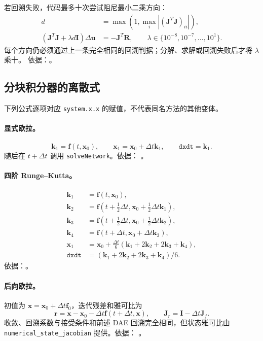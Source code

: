 若回溯失败，代码最多十次尝试阻尼最小二乘方向：
\begin{align}
 d&=\max\left(1,\max_i |(\mathbf J^T\mathbf J)_{ii}|\right),\\
 (\mathbf J^T\mathbf J+\lambda d\mathbf I)\Delta\mathbf u&=-\mathbf J^T\mathbf R,
 \qquad \lambda\in\{10^{-8},10^{-7},\ldots,10^1\}.
\end{align}
每个方向仍必须通过上一条完全相同的回溯判据；分解、求解或回溯失败后才将 $\lambda$ 乘十。
依据：。

\subsection{分块积分器的离散式}
下列公式逐项对应 \texttt{system.x.x} 的赋值，不代表同名方法的其他变体。

\paragraph{显式欧拉。}
\begin{equation}
 \mathbf k_1=\mathbf f(t,\mathbf x_0),\qquad
 \mathbf x_1=\mathbf x_0+\Delta t\mathbf k_1,
 \qquad \texttt{dxdt}=\mathbf k_1.
\end{equation}
随后在 $t+\Delta t$ 调用 \texttt{solveNetwork}。依据：
。

\paragraph{四阶 Runge--Kutta。}
\begin{align}
 \mathbf k_1&=\mathbf f(t,\mathbf x_0),\\
 \mathbf k_2&=\mathbf f(t+\tfrac12\Delta t,\mathbf x_0+\tfrac12\Delta t\mathbf k_1),\\
 \mathbf k_3&=\mathbf f(t+\tfrac12\Delta t,\mathbf x_0+\tfrac12\Delta t\mathbf k_2),\\
 \mathbf k_4&=\mathbf f(t+\Delta t,\mathbf x_0+\Delta t\mathbf k_3),\\
 \mathbf x_1&=\mathbf x_0+\frac{\Delta t}{6}
 (\mathbf k_1+2\mathbf k_2+2\mathbf k_3+\mathbf k_4),\\
 \texttt{dxdt}&=(\mathbf k_1+2\mathbf k_2+2\mathbf k_3+\mathbf k_4)/6.
\end{align}
依据：。

\paragraph{后向欧拉。}
初值为 $\mathbf x=\mathbf x_0+\Delta t\mathbf f_0$，迭代残差和雅可比为
\begin{equation}
 \mathbf r=\mathbf x-\mathbf x_0-\Delta t\mathbf f(t+\Delta t,\mathbf x),
 \qquad \mathbf J_r=\mathbf I-\Delta t\mathbf J_f.
\end{equation}
收敛、回溯系数与接受条件和前述 DAE 回溯完全相同，但状态雅可比由
\texttt{numerical\_state\_jacobian} 提供。依据：
。

